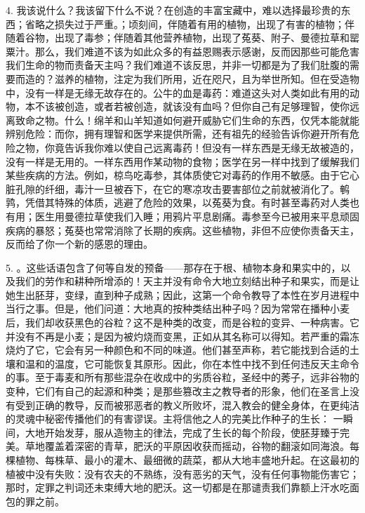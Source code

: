 4. 我该说什么？我该留下什么不说？在创造的丰富宝藏中，难以选择最珍贵的东西；省略之损失过于严重。；顷刻间，伴随着有用的植物，出现了有害的植物；伴随着谷物，出现了毒参；伴随着其他营养植物，出现了菟葵、附子、曼德拉草和罂粟汁。那么，我们难道不该为如此众多的有益恩赐表示感谢，反而因那些可能危害我们生命的物而责备天主吗？我们难道不该反思，并非一切都是为了我们肚腹的需要而造的？滋养的植物，注定为我们所用，近在咫尺，且为举世所知。但在受造物中，没有一样是无缘无故存在的。公牛的血是毒药：难道这头对人类如此有用的动物，本不该被创造，或者若被创造，就该没有血吗？但你自己有足够理智，使你远离致命之物。什么！绵羊和山羊知道如何避开威胁它们生命的东西，仅凭本能就能辨别危险：而你，拥有理智和医学来提供所需，还有祖先的经验告诉你避开所有危险之物，你竟告诉我你难以使自己远离毒药！但没有一样东西是无缘无故被造的，没有一样是无用的。一样东西用作某动物的食物；医学在另一样中找到了缓解我们某些疾病的方法。例如，椋鸟吃毒参，其体质使它对毒药的作用不敏感。由于它心脏孔隙的纤细，毒汁一旦被吞下，在它的寒凉攻击要害部位之前就被消化了。鹌鹑，凭借其特殊的体质，逃避了危险的效果，以菟葵为食。有时甚至毒药对人类也有用；医生用曼德拉草使我们入睡；用鸦片平息剧痛。毒参至今已被用来平息顽固疾病的暴怒；菟葵也常常消除了长期的疾病。这些植物，非但不应使你责备天主，反而给了你一个新的感恩的理由。\par

5. 。这些话语包含了何等自发的预备——那存在于根、植物本身和果实中的，以及我们的劳作和耕种所增添的！天主并没有命令大地立刻结出种子和果实，而是让她生出胚芽，变绿，直到种子成熟；因此，这第一个命令教导了本性在岁月进程中当行之事。但是，他们问道：大地真的按种类结出种子吗？因为常常在播种小麦后，我们却收获黑色的谷粒？这不是种类的改变，而是谷粒的变异、一种病害。它并没有不再是小麦；是因为被灼烧而变黑，正如从其名称可以得知。若严重的霜冻烧灼了它，它会有另一种颜色和不同的味道。他们甚至声称，若它能找到合适的土壤和温和的温度，它可能恢复其原形。因此，你在本性中找不到任何违反天主命令的事。至于毒麦和所有那些混杂在收成中的劣质谷粒，圣经中的莠子，远非谷物的变种，它们有自己的起源和种类；是那些篡改主之教导者的形象，他们在圣言上没有受到正确的教导，反而被邪恶者的教义所败坏，混入教会的健全身体，在更纯洁的灵魂中秘密传播他们的有害谬误。主将信他之人的完美比作种子的生长： 一瞬间，大地开始发芽，服从造物主的律法，完成了生长的每个阶段，使胚芽臻于完美。草地覆盖着深密的青草，肥沃的平原因收获而摇动，谷物的翻滚如同海浪。每棵植物、每株草、最小的灌木、最细微的蔬菜，都从大地丰盛地升起。在这最初的植被中没有失败：没有农夫的不熟练，没有恶劣的天气，没有任何事物能伤害它；那时，定罪之判词还未束缚大地的肥沃。这一切都是在那谴责我们靠额上汗水吃面包的罪之前。\par

